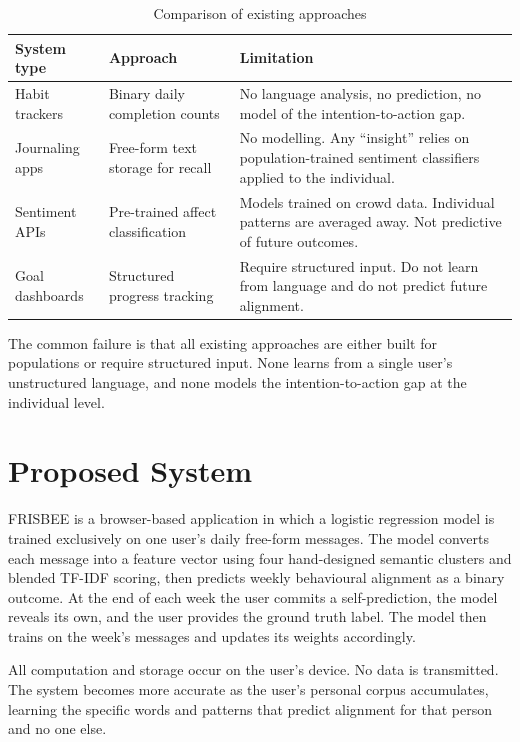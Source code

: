 \documentclass[11pt, a4paper]{report}
\begin{document}
\begin{table}[H]
\centering
\caption{Comparison of existing approaches}
\label{tab:existing}
\begin{tabularx}{\textwidth}{@{} p{3.0cm} p{3.4cm} X @{}}
\toprule
\textbf{System type} & \textbf{Approach} & \textbf{Limitation} \\
\midrule
Habit trackers
  & Binary daily completion counts
  & No language analysis, no prediction, no model of the
    intention-to-action gap. \\[6pt]
Journaling apps
  & Free-form text storage for recall
  & No modelling. Any ``insight'' relies on population-trained
    sentiment classifiers applied to the individual. \\[6pt]
Sentiment APIs
  & Pre-trained affect classification
  & Models trained on crowd data. Individual patterns are averaged
    away. Not predictive of future outcomes. \\[6pt]
Goal dashboards
  & Structured progress tracking
  & Require structured input. Do not learn from language and do
    not predict future alignment. \\
\bottomrule
\end{tabularx}
\end{table}

The common failure is that all existing approaches are either built for
populations or require structured input. None learns from a single user's
unstructured language, and none models the intention-to-action gap at the
individual level.

\section{Proposed System}

FRISBEE is a browser-based application in which a logistic regression model
is trained exclusively on one user's daily free-form messages. The model
converts each message into a feature vector using four hand-designed semantic
clusters and blended TF-IDF scoring, then predicts weekly behavioural
alignment as a binary outcome. At the end of each week the user commits a
self-prediction, the model reveals its own, and the user provides the ground
truth label. The model then trains on the week's messages and updates its
weights accordingly.

All computation and storage occur on the user's device. No data is
transmitted. The system becomes more accurate as the user's personal corpus
accumulates, learning the specific words and patterns that predict alignment
for that person and no one else.
\end{document}
